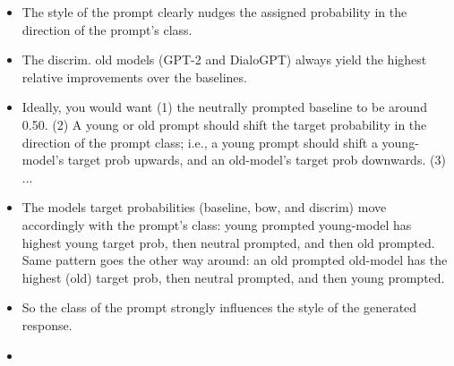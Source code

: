 \begin{itemize}
    \item The style of the prompt clearly nudges the assigned probability in the direction of the prompt's class.
    \item The discrim. old models (GPT-2 and DialoGPT) always yield the highest relative improvements over the baselines.
    \item Ideally, you would want (1) the neutrally prompted baseline to be around 0.50. (2) A young or old prompt should shift the target probability in the direction of the prompt class; i.e., a young prompt should shift a young-model's target prob upwards, and an old-model's target prob downwards. (3) ...
    \item The models target probabilities (baseline, bow, and discrim) move accordingly with the prompt's class: young prompted young-model has highest young target prob, then neutral prompted, and then old prompted. Same pattern goes the other way around: an old prompted old-model has the highest (old) target prob, then neutral prompted, and then young prompted.
    \item So the class of the prompt strongly influences the style of the generated response.
    \item {}
\end{itemize}

